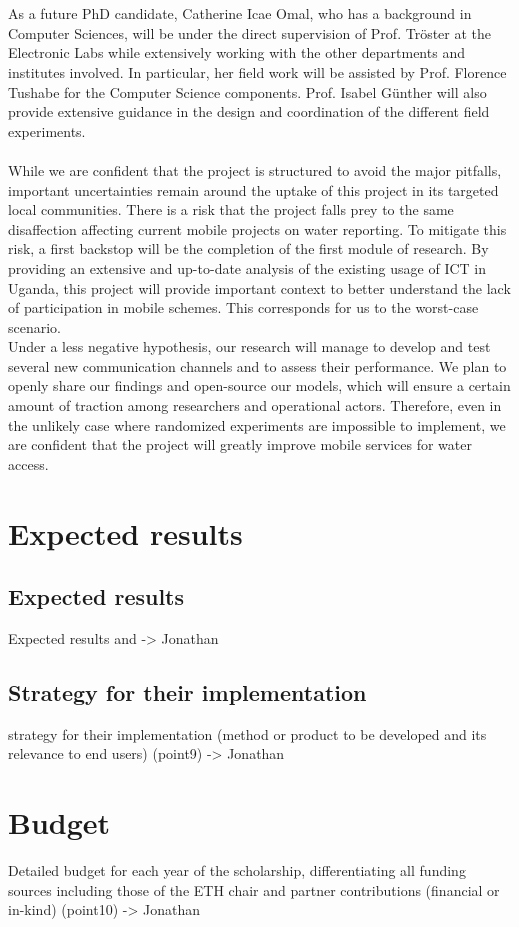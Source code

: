 \documentclass[11pt]{article}
\begin{document}
\\\\
As a future PhD candidate, Catherine Icae Omal, who has a background in Computer Sciences, will be under the direct supervision of Prof. Tröster at the Electronic Labs while extensively working with the other departments and institutes involved. In particular, her field work will be assisted by Prof. Florence Tushabe for the Computer Science components. Prof. Isabel Günther will also provide extensive guidance in the design and coordination of the different field experiments.
\\\\
While we are confident that the project is structured to avoid the major pitfalls, important uncertainties remain around the uptake of this project in its targeted local communities. There is a risk that the project falls prey to the same disaffection affecting current mobile projects on water reporting. To mitigate this risk, a first backstop will be the completion of the first module of research. By providing an extensive and up-to-date analysis of the existing usage of ICT in Uganda, this project will provide important context to better understand the lack of participation in mobile schemes. This corresponds for us to the worst-case scenario.
\\
Under a less negative hypothesis, our research will manage to develop and test several new communication channels and to assess their performance. We plan to openly share our findings and open-source our models, which will ensure a certain amount of traction among researchers and operational actors. Therefore, even in the unlikely case where randomized experiments are impossible to implement, we are confident that the project will greatly improve mobile services for water access.
\section{Expected results}\label{expected}
\subsection{Expected results}
Expected results and -> Jonathan
\subsection{Strategy for their implementation}
strategy for their implementation (method or product to be developed and its relevance to end users) (point9) -> Jonathan

\section{Budget}

Detailed budget for each year of the scholarship, differentiating all funding sources including those of the ETH chair and partner contributions (financial or in-kind) (point10) -> Jonathan




\end{document}
